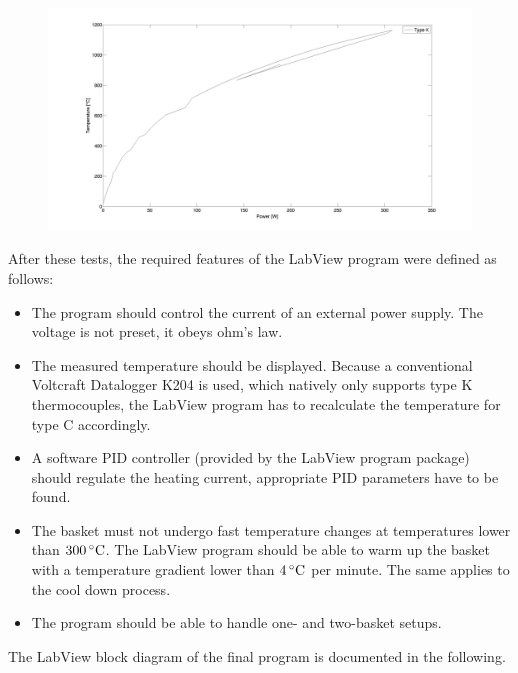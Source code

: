 \documentclass[parskip,12pt,headsepline,a4paper] {scrbook}
\begin{document}
\begin{figure}[ht]
\centerline{
\includegraphics[width=18cm]{./temperature/01072013_HeatUpDown.jpg}}
\end{figure}

After these tests, the required features of the LabView program were defined as follows:

\begin{itemize}
\item The program should control the current of an external power supply. The voltage is not preset, it obeys ohm's law.
\item The measured temperature should be displayed. Because a conventional Voltcraft Datalogger K204 is used, which natively only supports type K thermocouples, the LabView program has to recalculate the temperature for type C accordingly.
\item A software PID controller (provided by the LabView program package) should regulate the heating current, appropriate PID parameters have to be found.
\item The basket must not undergo fast temperature changes at temperatures lower than $\unit[300]{^\circ C}$. The LabView program should be able to warm up the basket with a temperature gradient lower than $\unit[4]{^\circ C}$ per minute. The same applies to the cool down process.
\item The program should be able to handle one- and two-basket setups.
\end{itemize}

The LabView block diagram of the final program is documented in the following.
\end{document}
